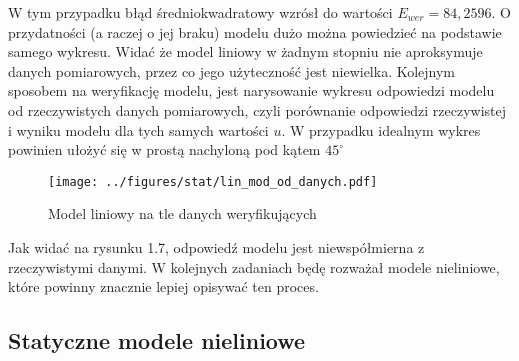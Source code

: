 \documentclass[a4paper,titlepage,11pt,floatssmall]{mwrep}
\begin{document}
W tym przypadku błąd średniokwadratowy wzrósł do wartości $E_{wer} = 84,2596$. O przydatności (a raczej o jej braku) modelu dużo można powiedzieć na podstawie samego wykresu. Widać że model liniowy w żadnym stopniu nie aproksymuje danych pomiarowych, przez co jego użyteczność jest niewielka.  
\newpage 
Kolejnym sposobem na weryfikację modelu, jest narysowanie wykresu odpowiedzi modelu od rzeczywistych danych pomiarowych, czyli porównanie odpowiedzi rzeczywistej i wyniku modelu dla tych samych wartości $u$. W przypadku idealnym wykres powinien ułożyć się w prostą nachyloną pod kątem $45^{\circ}$
\begin{figure}[H]
\centering
\texttt{[image: ../figures/stat/lin\_mod\_od\_danych.pdf]}
\caption{Model liniowy na tle danych weryfikujących}
\end{figure}
Jak widać na rysunku 1.7, odpowiedź modelu jest niewspółmierna z rzeczywistymi danymi. W kolejnych zadaniach będę rozważał modele nieliniowe, które powinny znacznie lepiej opisywać ten proces.

\subsection{Statyczne modele nieliniowe}
\end{document}
